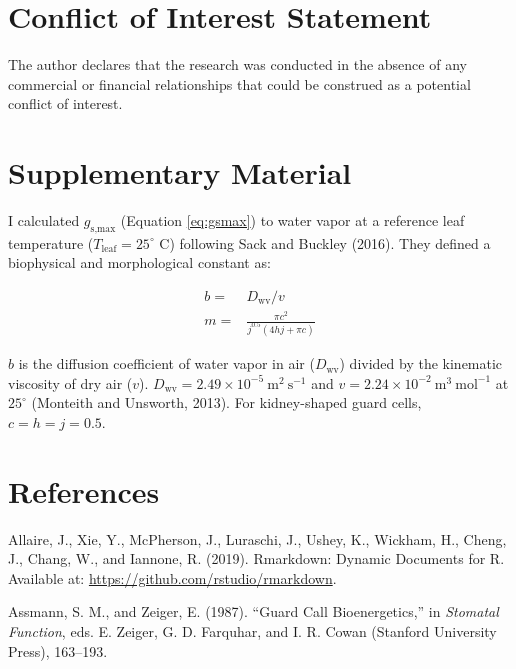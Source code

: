 \documentclass[utf8]{frontiersSCNS}
\newcommand{\gsmax}{$g_\text{s,max}$}
\begin{document}
\hypertarget{conflict-of-interest-statement}{%
\section*{Conflict of Interest
Statement}\label{conflict-of-interest-statement}}

The author declares that the research was conducted in the absence of
any commercial or financial relationships that could be construed as a
potential conflict of interest.

\hypertarget{supplementary-material}{%
\section*{Supplementary Material}\label{supplementary-material}}

I calculated \gsmax{} (Equation \ref{eq:gsmax}) to water vapor at a
reference leaf temperature (\(T_\mathrm{leaf} = 25 ^ \circ\) C)
following Sack and Buckley (2016). They defined a biophysical and
morphological constant as:

\begin{align*}
  b = & D_\text{wv} / v \\
  m = & \frac{\pi c ^ 2}{j ^ {0.5} (4 h j + \pi c)}
\end{align*}

\(b\) is the diffusion coefficient of water vapor in air
(\(D_\text{wv}\)) divided by the kinematic viscosity of dry air (\(v\)).
\(D_\text{wv} = 2.49 \times 10^{-5} ~ \text{m}^2 ~ \text{s}^{-1}\) and
\(v = 2.24 \times 10 ^ {-2} ~ \text{m}^3 ~ \text{mol} ^ {-1}\) at
\(25 ^ \circ\) (Monteith and Unsworth, 2013). For kidney-shaped guard
cells, \(c = h = j = 0.5\).

\hypertarget{references}{%
\section*{References}\label{references}}

\hypertarget{refs}{}
\leavevmode\hypertarget{ref-allaire_rmarkdown:_2019}{}%
Allaire, J., Xie, Y., McPherson, J., Luraschi, J., Ushey, K., Wickham,
H., Cheng, J., Chang, W., and Iannone, R. (2019). Rmarkdown: Dynamic
Documents for R. Available at:
\url{https://github.com/rstudio/rmarkdown}.

\leavevmode\hypertarget{ref-assmann_guard_1987}{}%
Assmann, S. M., and Zeiger, E. (1987). ``Guard Call Bioenergetics,'' in
\emph{Stomatal Function}, eds. E. Zeiger, G. D. Farquhar, and I. R.
Cowan (Stanford University Press), 163--193.
\end{document}
